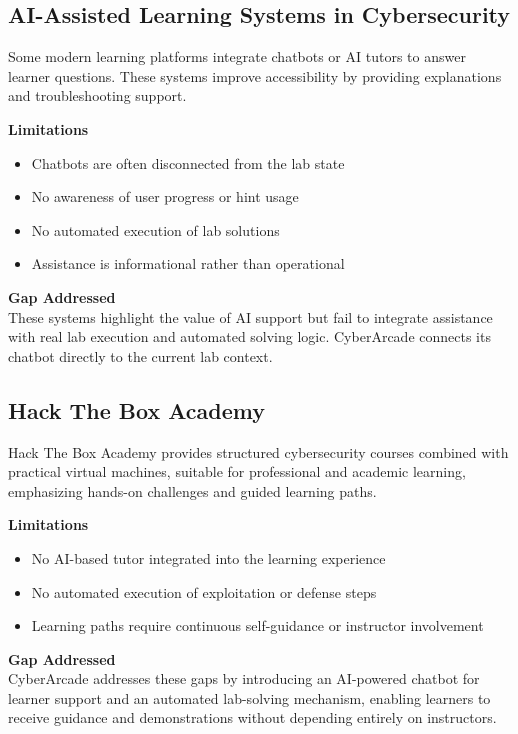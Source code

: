 \documentclass[12pt,a4paper]{report}
\begin{document}
\subsection{AI-Assisted Learning Systems in Cybersecurity}

Some modern learning platforms integrate chatbots or AI tutors to answer learner questions. These
systems improve accessibility by providing explanations and troubleshooting support.

\textbf{Limitations}
\begin{itemize}
  \item Chatbots are often disconnected from the lab state
  \item No awareness of user progress or hint usage
  \item No automated execution of lab solutions
  \item Assistance is informational rather than operational
\end{itemize}

\textbf{Gap Addressed}\\
These systems highlight the value of AI support but fail to integrate assistance with real lab
execution and automated solving logic. CyberArcade connects its chatbot directly to the current lab
context.

\subsection{Hack The Box Academy}

Hack The Box Academy provides structured cybersecurity courses combined with practical virtual
machines, suitable for professional and academic learning, emphasizing hands-on challenges and guided
learning paths.

\textbf{Limitations}
\begin{itemize}
  \item No AI-based tutor integrated into the learning experience
  \item No automated execution of exploitation or defense steps
  \item Learning paths require continuous self-guidance or instructor involvement
\end{itemize}

\textbf{Gap Addressed}\\
CyberArcade addresses these gaps by introducing an AI-powered chatbot for learner support and an
automated lab-solving mechanism, enabling learners to receive guidance and demonstrations without
depending entirely on instructors.
\end{document}
